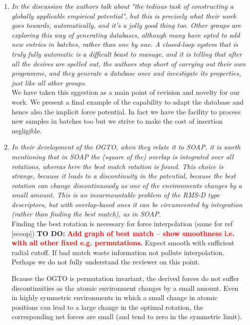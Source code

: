 \documentclass[11pt,twoside]{article}
\newcommand{\todo}[1]{{\bf TO DO:} \textcolor{red}{\bf{#1}}}
\begin{document}
\begin{enumerate}
\item{\it
In the discussion the authors talk about "the tedious task of
   constructing a globally applicable empirical potential", but this
   is precisely what their work goes towards, automatically, and it's
   a jolly good thing too. Other groups are exploring this way of
   generating databases, although many have opted to add new entries
   in batches, rather than one by one. A closed-loop system that is
   truly fully automatic is a difficult beast to manage, and it is
   telling that after all the desires are spelled out, the authors
   stop short of carrying out their own programme, and they generate a
   database once and investigate its properties, just like all other
   groups.
}\\[0.1in]
We have taken this sggestion as a main point of revision and novelty for our work. 
We present a final example of the capability to adapt the database and hence also the implicit force potential.
In fact we have the facility to process new samples in batches too but we strive to make the cost of insertion negligible. 

\item{\it
In their development of the OGTO, when they relate it to SOAP, it
   is worth mentioning that in SOAP the (square of the) overlap is
   integrated over all rotations, whereas here the best match rotation
   is found. This choice is strange, because it leads to a
   discontinuity in the potential, because the best rotation can
   change discontinuously as one of the environments changes by a
   small amount. This is an insurmountable problem of the RMS-D type
   descriptors, but with overlap-based ones it can be circumvented by
   integration (rather than finding the best match), as in SOAP.
}\\[0.1in]
Finding the best rotation is necessary for force interpolation (same for ref [scoop])
\todo{ Add graph of best match -- show smoothness i.e. with all other fixed e.g. permutations.}
Expect smooth with sufficient radial cutoff.
If bad match waste information not pollute interpolation.
Perhaps we do not fully understand the reviewer on this point.

Bcause the OGTO is permutation invariant, the derived forces do not suffer discontinuities as the atomic environment changes by a small amount. 
Even in highly symmetric environments in which a small change in atomic positions can lead to a large change in the optimal rotation, the corresponding net forces are small (and tend to zero in the symmetric limit).


\end{enumerate}
\end{document}

